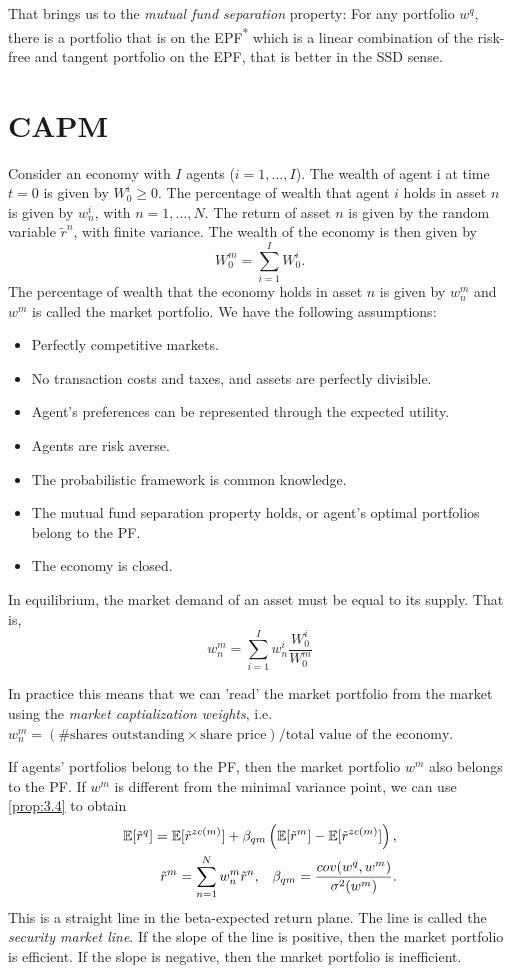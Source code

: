 \documentclass[twoside, titlepage]{article}
\begin{document}
That brings us to the \textit{mutual fund separation} property: For any portfolio $w^q$, there is a portfolio that is on the EPF\textsuperscript{*} which is a linear combination of the risk-free and tangent portfolio on the EPF, that is better in the SSD sense.

\section{CAPM}

Consider an economy with $I$ agents ($i = 1, \dots, I$). The wealth of agent i at time $t=0$ is given by $W^i_0 \geq 0$. The percentage of wealth that agent $i$ holds in asset $n$ is given by $w^i_n$, with $n = 1, \dots, N$. The return of asset $n$ is given by the random variable $\tilde{r}^n$, with finite variance. The wealth of the economy is then given by
\[
    W_0^m = \sum_{i=1}^{I} W_0^i.
\]
The percentage of wealth that the economy holds in asset $n$ is given by
$w^m_n$ and $w^m$ is called the market portfolio. We have the following assumptions:
\begin{itemize}
    \item Perfectly competitive markets.
    \item No transaction costs and taxes, and assets are perfectly divisible.
    \item Agent's preferences can be represented through the expected utility.
    \item Agents are risk averse.
    \item The probabilistic framework is common knowledge.
    \item The mutual fund separation property holds, or agent's optimal portfolios belong to the PF.
    \item The economy is closed.
\end{itemize}

In equilibrium, the market demand of an asset must be equal to its supply. That is,
\[
    w^m_n = \sum_{i=1}^{I} w^i_n \frac{W^i_0}{W^m_0}
\]
\begin{remark}
    In practice this means that we can 'read' the market portfolio from the market using the \textit{market captialization weights}, i.e. $w^m_n = (\# \text{shares outstanding} \times \text{share price}) / \text{total value of the economy}$.
\end{remark}
If agents' portfolios belong to the PF, then the market portfolio $w^m$ also belongs to the PF. If $w^m$ is different from the minimal variance point, we can use \cref{prop:3.4} to obtain
\begin{align*}
    \mathbb{E}[\tilde{r}^q] = \mathbb{E}[\tilde{r}^{zc(m)}] + \beta_{qm}\left(\mathbb{E}[\tilde{r}^m] - \mathbb{E}[\tilde{r}^{zc(m)}]\right), \\
    \tilde{r}^m = \sum_{n=1}^{N} w^m_n \tilde{r}^n, \;\;\; \beta_{qm} = \frac{cov(w^q, w^m)}{\sigma^2(w^m)}.
\end{align*}
This is a straight line in the beta-expected return plane. The line is called the \textit{security market line}. If the slope of the line is positive, then the market portfolio is efficient. If the slope is negative, then the market portfolio is inefficient.
\end{document}
